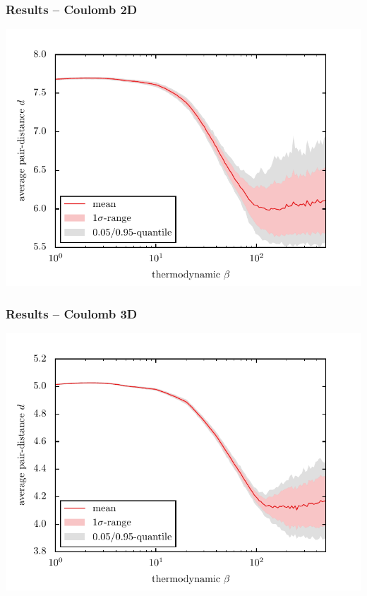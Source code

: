 \documentclass[mathserif,serif]{beamer}
\begin{document}
\begin{frame}
	\frametitle{Results -- Coulomb 2D}
	\centering
	\includegraphics[width=\textwidth]{../report/figures/temp_dep_coulomb2d.pdf}
\end{frame}

\begin{frame}
	\frametitle{Results -- Coulomb 3D}
	\centering
	\includegraphics[width=\textwidth]{../report/figures/temp_dep_coulomb3d.pdf}
\end{frame}



\end{document}
